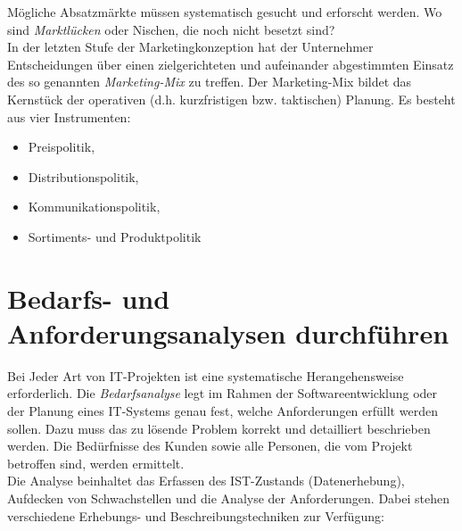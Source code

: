 \documentclass[a4paper, 12pt]{report}
\begin{document}
Mögliche Absatzmärkte müssen systematisch gesucht und erforscht werden. Wo sind
\emph{Marktlücken} oder Nischen, die noch nicht besetzt sind? \\

In der letzten Stufe der Marketingkonzeption hat der Unternehmer Entscheidungen
über einen zielgerichteten und aufeinander abgestimmten Einsatz des so genannten
\emph{Marketing-Mix} zu treffen. Der Marketing-Mix bildet das Kernstück der
operativen (d.h. kurzfristigen bzw. taktischen) Planung. Es besteht aus vier
Instrumenten:

\begin{itemize}
    \item Preispolitik,
    \item Distributionspolitik,
    \item Kommunikationspolitik,
    \item Sortiments- und Produktpolitik
\end{itemize}

\section{Bedarfs- und Anforderungsanalysen durchführen}

Bei Jeder Art von IT-Projekten ist eine systematische Herangehensweise
erforderlich. Die \emph{Bedarfsanalyse} legt im Rahmen der Softwareentwicklung
oder der Planung eines IT-Systems genau fest, welche Anforderungen erfüllt
werden sollen. Dazu muss das zu lösende Problem korrekt und detailliert
beschrieben werden. Die Bedürfnisse des Kunden sowie alle Personen, die vom
Projekt betroffen sind, werden ermittelt. \\

Die Analyse beinhaltet das Erfassen des IST-Zustands (Datenerhebung), Aufdecken
von Schwachstellen und die Analyse der Anforderungen. Dabei stehen verschiedene
Erhebungs- und Beschreibungstechniken zur Verfügung:
\end{document}

